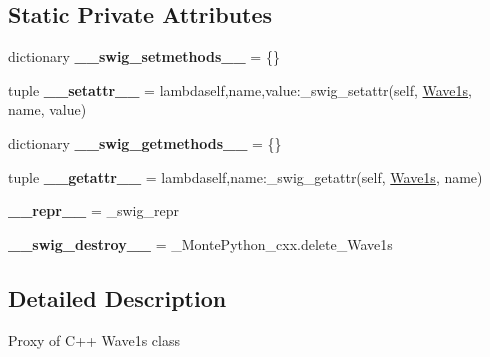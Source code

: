 \subsection*{Static Private Attributes}
\begin{DoxyCompactItemize}
\item 
\hypertarget{classMontePython__cxx_1_1Wave1s_ad20dee6f5db01e3d3efbe83da07255df}{}dictionary {\bfseries \+\_\+\+\_\+swig\+\_\+setmethods\+\_\+\+\_\+} = \{\}\label{classMontePython__cxx_1_1Wave1s_ad20dee6f5db01e3d3efbe83da07255df}

\item 
\hypertarget{classMontePython__cxx_1_1Wave1s_a171966675e6e38c5c8af3ac11398a3e4}{}tuple {\bfseries \+\_\+\+\_\+setattr\+\_\+\+\_\+} = lambdaself,name,value\+:\+\_\+swig\+\_\+setattr(self, \hyperlink{classMontePython__cxx_1_1Wave1s}{Wave1s}, name, value)\label{classMontePython__cxx_1_1Wave1s_a171966675e6e38c5c8af3ac11398a3e4}

\item 
\hypertarget{classMontePython__cxx_1_1Wave1s_a49b560de93ed1acb20d4a66ae1ab245c}{}dictionary {\bfseries \+\_\+\+\_\+swig\+\_\+getmethods\+\_\+\+\_\+} = \{\}\label{classMontePython__cxx_1_1Wave1s_a49b560de93ed1acb20d4a66ae1ab245c}

\item 
\hypertarget{classMontePython__cxx_1_1Wave1s_a8deb4fece9bc3b8178d18d2ce80da148}{}tuple {\bfseries \+\_\+\+\_\+getattr\+\_\+\+\_\+} = lambdaself,name\+:\+\_\+swig\+\_\+getattr(self, \hyperlink{classMontePython__cxx_1_1Wave1s}{Wave1s}, name)\label{classMontePython__cxx_1_1Wave1s_a8deb4fece9bc3b8178d18d2ce80da148}

\item 
\hypertarget{classMontePython__cxx_1_1Wave1s_a4b0e608d5130d090c45847d9ac577de5}{}{\bfseries \+\_\+\+\_\+repr\+\_\+\+\_\+} = \+\_\+swig\+\_\+repr\label{classMontePython__cxx_1_1Wave1s_a4b0e608d5130d090c45847d9ac577de5}

\item 
\hypertarget{classMontePython__cxx_1_1Wave1s_a0f3f13451110ad3c6475a1cedae2a7b5}{}{\bfseries \+\_\+\+\_\+swig\+\_\+destroy\+\_\+\+\_\+} = \+\_\+\+Monte\+Python\+\_\+cxx.\+delete\+\_\+\+Wave1s\label{classMontePython__cxx_1_1Wave1s_a0f3f13451110ad3c6475a1cedae2a7b5}

\end{DoxyCompactItemize}


\subsection{Detailed Description}
\begin{DoxyVerb}Proxy of C++ Wave1s class\end{DoxyVerb}
 

